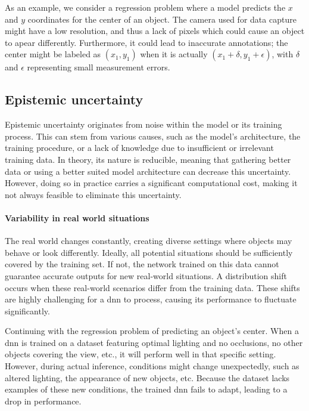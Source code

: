 As an example, we consider a regression problem where a model predicts the $x$ and $y$ coordinates for the center of an object.
The camera used for data capture might have a low resolution, and thus a lack of pixels which could cause an object to apear differently.
Furthermore, it could lead to inaccurate annotations; the center might be labeled as $(x_1, y_1)$ when it is actually $(x_1+\delta, y_1+\epsilon)$, with $\delta$ and $\epsilon$ representing small measurement errors.

\subsection{Epistemic uncertainty}\label{ch:literature-study_section:uncertainty-in-ai_subsection:epistemic-uncertainty}
Epistemic uncertainty originates from noise within the model or its training process.
This can stem from various causes, such as the model's architecture, the training procedure, or a lack of knowledge due to insufficient or irrelevant training data.
In theory, its nature is reducible, meaning that gathering better data or using a better suited model architecture can decrease this uncertainty.
However, doing so in practice carries a significant computational cost, making it not always feasible to eliminate this uncertainty.

\paragraph{Variability in real world situations} \label{ch:literature-study_section:uncertainty-in-ai_subsection:epistemic-uncertainty_paragraph:variability-in-real-world-situations}
The real world changes constantly, creating diverse settings where objects may behave or look differently.
Ideally, all potential situations should be sufficiently covered by the training set.
If not, the network trained on this data cannot guarantee accurate outputs for new real-world situations.
A distribution shift occurs when these real-world scenarios differ from the training data.
These shifts are highly challenging for a \gls{dnn} to process, causing its performance to fluctuate significantly.

Continuing with the regression problem of predicting an object's center.
When a \gls{dnn} is trained on a dataset featuring optimal lighting and no occlusions, no other objects covering the view, etc., it will perform well in that specific setting.
However, during actual inference, conditions might change unexpectedly, such as altered lighting, the appearance of new objects, etc.
Because the dataset lacks examples of these new conditions, the trained \gls{dnn} fails to adapt, leading to a drop in performance.


